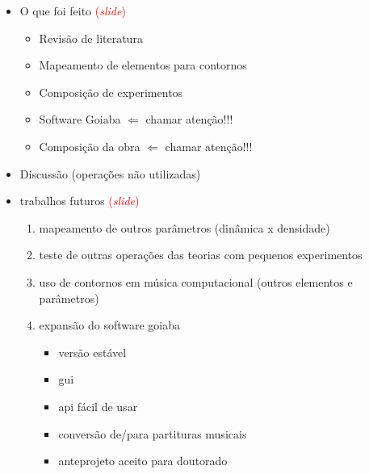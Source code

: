 \documentclass[12pt,a4paper]{article}
\newcommand{\slide}{\textcolor{red}{(\textit{slide})}}
\begin{document}
\begin{itemize}
\item O que foi feito \slide{}
  \begin{itemize}
  \item Revisão de literatura
  \item Mapeamento de elementos para contornos
  \item Composição de experimentos
  \item Software Goiaba $\Longleftarrow$ chamar atenção!!!
  \item Composição da obra $\Longleftarrow$ chamar atenção!!!
  \end{itemize}
\item Discussão (operações não utilizadas)
\item trabalhos futuros \slide{}
  \begin{enumerate}
  \item mapeamento de outros parâmetros (dinâmica x densidade)
  \item teste de outras operações das teorias com pequenos experimentos
  \item uso de contornos em música computacional (outros elementos e parâmetros)
  \item expansão do software goiaba
    \begin{itemize}
    \item versão estável
    \item gui
    \item api fácil de usar
    \item conversão de/para partituras musicais
    \item anteprojeto aceito para doutorado
    \end{itemize}
  \end{enumerate}
\end{itemize}
\end{document}
